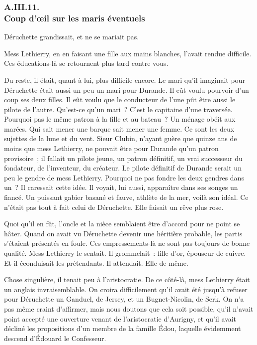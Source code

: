\documentclass[french,twoside]{book} %
\begin{document}
 \subsubsection[{A.III.11. Coup d’œil sur les maris éventuels}]{A.III.11. \\
Coup d’œil sur les maris éventuels}
\noindent Déruchette grandissait, et ne se mariait pas.\par
Mess Lethierry, en en faisant une fille aux mains blanches, l’avait rendue difficile. Ces éducations-là se retournent plus tard contre vous.\par
Du reste, il était, quant à lui, plus difficile encore. Le mari qu’il imaginait pour Déruchette était aussi un peu un mari pour Durande. Il eût voulu pourvoir d’un coup ses deux filles. Il eût voulu que le conducteur de l’une pût être aussi le pilote de l’autre. Qu’est-ce qu’un mari ? C’est le capitaine d’une traversée. Pourquoi pas le même patron à la fille et au bateau ? Un ménage obéit aux marées. Qui sait mener une barque sait mener une femme. Ce sont les deux sujettes de la lune et du vent. Sieur Clubin, n’ayant guère que quinze ans de moins que mess Lethierry, ne pouvait être pour Durande qu’un patron provisoire ; il fallait un pilote jeune, un patron définitif, un vrai successeur du fondateur, de l’inventeur, du créateur. Le pilote définitif  de Durande serait un peu le gendre de mess Lethierry. Pourquoi ne pas fondre les deux gendres dans un ? Il caressait cette idée. Il voyait, lui aussi, apparaître dans ses songes un fiancé. Un puissant gabier basané et fauve, athlète de la mer, voilà son idéal. Ce n’était pas tout à fait celui de Déruchette. Elle faisait un rêve plus rose.\par
Quoi qu’il en fût, l’oncle et la nièce semblaient être d’accord pour ne point se hâter. Quand on avait vu Déruchette devenir une héritière probable, les partis s’étaient présentés en foule. Ces empressements-là ne sont pas toujours de bonne qualité. Mess Lethierry le sentait. Il grommelait : fille d’or, épouseur de cuivre. Et il éconduisait les prétendants. Il attendait. Elle de même.\par
Chose singulière, il tenait peu à l’aristocratie. De ce côté-là, mess Lethierry était un anglais invraisemblable. On croira difficilement qu’il avait été jusqu’à refuser pour Déruchette un Ganduel, de Jersey, et un Bugnet-Nicolin, de Serk. On n’a pas même craint d’affirmer, mais nous doutons que cela soit possible, qu’il n’avait point accepté une ouverture venant de l’aristocratie d’Aurigny, et qu’il avait décliné les propositions d’un membre de la famille Édou, laquelle évidemment descend d’Édouard le Confesseur.
\end{document}
